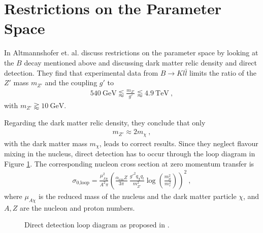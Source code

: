 
\section{Restrictions on the Parameter Space\label{sec:ParamSpace}}
In \cite{Z} Altmannshofer et. al. discuss restrictions on the parameter space by looking at the $B$ decay mentioned above and discussing dark matter relic density and direct detection. They find that experimental data from $B\rightarrow Kl\bar{l}$ limits the ratio of the $Z'$ mass $m_{Z'}$ and the coupling $g'$ to
\begin{align}\label{eq:BoundBS}
	\SI{540}{\giga\electronvolt}\lessapprox\frac{m_{Z'}}{g'}\lessapprox\SI{4.9}{\tera\electronvolt} \ ,
\end{align}
with $m_{Z'}\gtrapprox\SI{10}{\giga\electronvolt}$.



\begin{minipage}{0.67\textwidth}
	Regarding the dark matter relic density, they conclude that only
	\begin{align}\label{eq:Relic}
		m_{Z'}\approx 2m_\chi \ ,
	\end{align}
	with the dark matter mass $m_\chi$, leads to correct results. Since they neglect flavour mixing in the nucleus, direct detection has to occur through the loop diagram in Figure \ref{fig:Loop}. The corresponding nucleon cross section at zero momentum transfer is
	\begin{align}\label{eq:Loop}
		\sigma_\text{0,loop} = \frac{\mu_{A\chi}^2}{A^2\pi}\left(\frac{\alpha_{em}Z}{3\pi}\ \frac{g'^2q_\chi q_l}{m_{Z'}^2}\log\left(\frac{m_\mu^2}{m_\tau^2}\right)\right)^2 \ ,
	\end{align}
	where $\mu_{A\chi}$ is the reduced mass of the nucleus and the dark matter particle $\chi$, and $A,Z$ are the nucleon and proton numbers.
\end{minipage} \hfill
\begin{minipage}{0.28\textwidth}
	\begin{figure}[H]
		\centering
		\resizebox{\textwidth}{!}{
				
		}
		\captionsetup{width=\textwidth}
		\caption{Direct detection loop diagram as proposed in \cite{Z}.}
		\label{fig:Loop}
	\end{figure}
\end{minipage}



